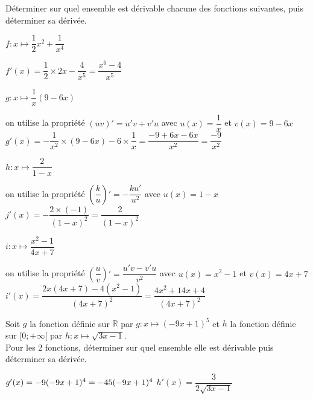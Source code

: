 \documentclass[11pt,a4paper]{article}  %
\begin{document}
Déterminer sur quel ensemble est dérivable chacune des fonctions suivantes, puis déterminer sa dérivée.
	\begin{enumMet}
		\item $f: x \mapsto \dfrac{1}{2} x^2+\dfrac{1}{x^4}$
		\begin{corrBox}
			$f'(x)=\dfrac{1}{2}\times 2x-\dfrac{4}{x^5}=\dfrac{x^6-4}{x^5}$
		\end{corrBox}
		\item $g: x \mapsto \dfrac{1}{x}(9-6 x)$
		\begin{corrBox}
			on utilise la propriété $(uv)'=u'v+v'u$ avec $u(x)=\dfrac{1}{x}$ et $v(x)=9-6x$\\
			$g'(x)=-\dfrac{1}{x^2}\times(9-6x)-6\times\dfrac{1}{x}=\dfrac{-9+6x-6x}{x^2}=\dfrac{-9}{x^2}$
		\end{corrBox}
		\item $h: x \mapsto \dfrac{2}{1-x}$
		\begin{corrBox}
			on utilise la propriété $\left(\dfrac{k}{u}\right)'=-\dfrac{ku'}{u^2}$ avec $u(x)=1-x$\\
			$j'(x)=-\dfrac{2\times (-1)}{(1-x)^2}=\dfrac{2}{(1-x)^2}$
		\end{corrBox}
		\item $i: x \mapsto \dfrac{x^2-1}{4 x+7}$
		\begin{corrBox}
			on utilise la propriété $\left(\dfrac{u}{v}\right)'=\dfrac{u'v-v'u}{v^2}$ avec $u(x)=x^2-1$ et $v(x)=4x+7$\\
			$i'(x)=\dfrac{2x(4x+7)-4(x^2-1)}{(4x+7)^2}=\dfrac{4x^2+14x+4}{(4x+7)^2}$
		\end{corrBox}
	\end{enumMet}


\exercice{}

Soit $g$ la fonction définie sur $\mathbb{R}$ par $g: x \mapsto(-9 x+1)^5$ et $h$ la fonction définie sur $[0 ;+\infty[$ par $h: x \mapsto \sqrt{3 x-1}$.\\
Pour les 2 fonctions, déterminer sur quel ensemble elle est dérivable puis déterminer sa dérivée.

\begin{corrBox}
	$g'(x)=-9\time5(-9x+1)^4=-45(-9x+1)^4$ \quad \quad \quad \quad $h'(x)=\dfrac{3}{2\sqrt{3x-1}}$
\end{corrBox}

\exercice{}
\end{document}
